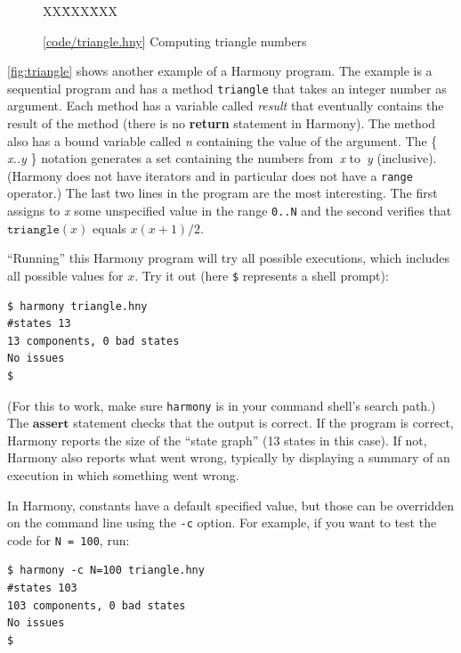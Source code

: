 \documentclass{report}
\newcommand{\harmonysource}[1]{
\begin{tabbing}
XX\=XXX\=XXX\kill
    
\end{tabbing}
}
\newcommand{\harmonylink}[1]{%
[\href{https://harmony.cs.cornell.edu/#1}{\underline{#1}}]%
}
\newenvironment{code}{
\tcolorbox
}{
\endtcolorbox
}
\begin{document}
\begin{figure}
\begin{code}
\harmonysource{triangle}
\end{code}
\caption{\harmonylink{code/triangle.hny} Computing triangle numbers}
\label{fig:triangle}
\end{figure}

\autoref{fig:triangle} shows another example of a Harmony program.
The example is a sequential program
and has a method \texttt{triangle} that takes
an integer number as argument.  Each method has a variable called
\textit{result} that eventually contains the result of the
method (there is no \textbf{return} statement in Harmony).  The method
also has a bound variable called \textit{n} containing the value of the
argument.  The \{ \textit{x..y} \} notation generates a set containing the numbers
from~\textit{x} to~\textit{y} (inclusive).
(Harmony does not have iterators and in particular does
not have a \texttt{range} operator.)
The last two lines in the program are
the most interesting.
The first assigns to \textit{x} some unspecified value in the range \texttt{0..N}
and the second verifies that $\mathtt{triangle}(x)$ equals $x(x+1)/2$.

``Running'' this Harmony program will try all possible executions, which
includes all possible values for $x$.  Try it out (here \texttt{\$}
represents a shell prompt):

\begin{code}
\begin{verbatim}
$ harmony triangle.hny
#states 13
13 components, 0 bad states
No issues
$
\end{verbatim}
\end{code}

(For this to work, make sure \texttt{harmony} is in your command shell's search path.)
The $\textbf{assert}$ statement checks that the output is
correct.  If the program is correct, Harmony reports the size of the
``state graph'' (13 states in this case).  If not, Harmony also
reports what went wrong, typically by displaying a summary of an execution in
which something went wrong.

In Harmony, constants have a default specified value,
but those can be overridden on the command
line using the \texttt{-c} option.
%
For example, if you want to test the code for \texttt{N = 100}, run:
\begin{code}
\begin{verbatim}
$ harmony -c N=100 triangle.hny
#states 103
103 components, 0 bad states
No issues
$
\end{verbatim}
\end{code}
\end{document}
